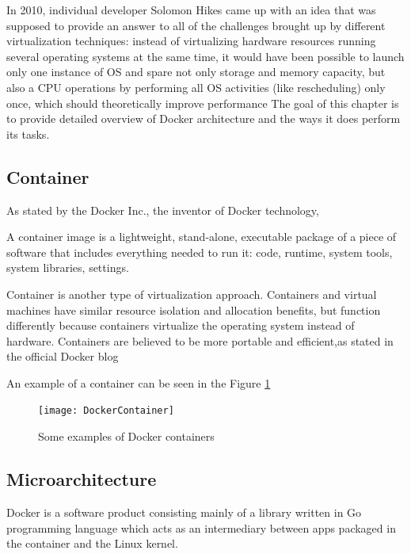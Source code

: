 In 2010, individual developer Solomon Hikes came up with an idea that was
supposed to provide an answer to all of the challenges brought up by different
virtualization techniques: instead of virtualizing hardware resources running
several operating systems at the same time, it would have been possible
to launch only one instance of OS and spare not only storage and memory capacity,
but also a CPU operations by performing all
OS activities (like rescheduling) only once, which should theoretically
improve performance
The goal of this chapter is to provide detailed overview of Docker architecture
and the ways it does perform its tasks.

\subsection{Container}

As stated by the Docker Inc., the inventor of Docker technology,

\begin{definition}
A container image is a lightweight, stand-alone,
executable package of a piece of software that includes everything
needed to run it: code, runtime,
system tools, system libraries, settings. \cite{DockerDefinition}
\end{definition}

Container is another type of virtualization approach.
Containers and virtual machines have
similar resource isolation and allocation benefits,
but function differently because containers
virtualize the operating system instead of hardware.
Containers are believed to be more portable and
efficient,as stated in
the official Docker blog\cite{DockerEfficiency}

An example of a container can be
seen in the Figure \ref{fig:DockerContainerPic}

\begin{figure}
\texttt{[image: DockerContainer]}
\caption{Some examples of Docker containers}
\cite{DockerContainerPic}
\label{fig:DockerContainerPic}
\end{figure}

\subsection{Microarchitecture}

Docker is a software product consisting mainly of a
library written in Go programming language
which acts as an intermediary between apps packaged
in the container and the Linux kernel.

